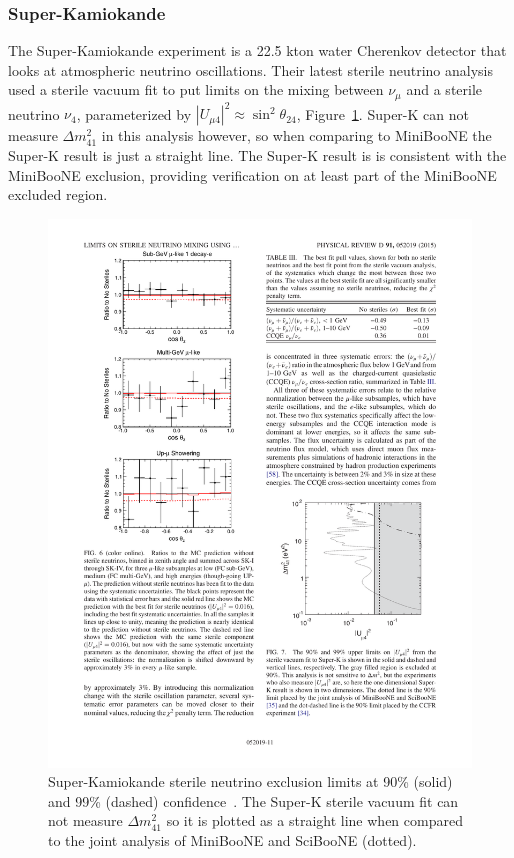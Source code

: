 \documentclass[aps,prd,twocolumn,nofootinbib]{revtex4-1}
\begin{document}
\subsubsection{Super-Kamiokande}
The Super-Kamiokande experiment is a 22.5 kton water Cherenkov detector that looks at atmospheric neutrino oscillations. Their latest sterile neutrino analysis~\cite{SuperK} used a sterile vacuum fit to put limits on the mixing between $\nu_{\mu}$ and a sterile neutrino $\nu_4$, parameterized by $\left|U_{\mu 4}\right|^2 \approx \sin^2 \theta_{24}$, Figure~\ref{fig:SuperK}. Super-K can not measure $\Delta m^{2}_{41}$ in this analysis however, so when comparing to MiniBooNE the Super-K result is just a straight line. The Super-K result is is consistent with the MiniBooNE exclusion, providing verification on at least part of the MiniBooNE excluded region.

\begin{figure}[H]
  \centering
  \includegraphics[width=1\columnwidth]{../figures/sk1.pdf}
  \caption{Super-Kamiokande sterile neutrino exclusion limits at 90\% (solid) and 99\% (dashed) confidence~\cite{SuperK}. The Super-K sterile vacuum fit can not measure $\Delta m^{2}_{41}$ so it is plotted as a straight line when compared to the joint analysis of MiniBooNE and SciBooNE (dotted).}
  \label{fig:SuperK}
\end{figure}
\end{document}
